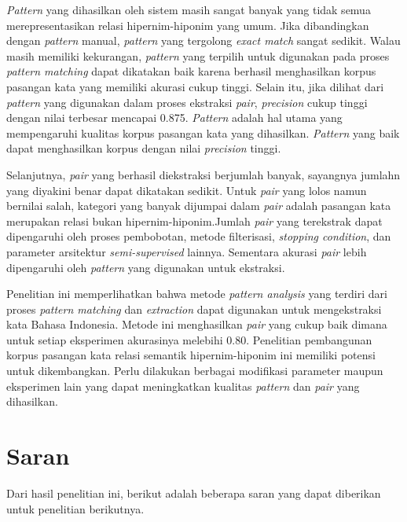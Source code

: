 \textit{Pattern} yang dihasilkan oleh sistem masih sangat banyak yang tidak semua merepresentasikan relasi hipernim-hiponim yang umum. Jika dibandingkan dengan \textit{pattern} manual, \textit{pattern} yang tergolong \textit{exact match} sangat sedikit. Walau masih memiliki kekurangan, \textit{pattern} yang terpilih untuk digunakan pada proses \textit{pattern matching} dapat dikatakan baik karena berhasil menghasilkan korpus pasangan kata yang memiliki akurasi cukup tinggi. Selain itu, jika dilihat dari \textit{pattern} yang digunakan dalam proses ekstraksi \textit{pair}, \textit{precision} cukup tinggi dengan nilai terbesar mencapai 0.875. \textit{Pattern} adalah hal utama yang mempengaruhi kualitas korpus pasangan kata yang dihasilkan. \textit{Pattern} yang baik dapat menghasilkan korpus dengan nilai \textit{precision} tinggi.

Selanjutnya, \textit{pair} yang berhasil diekstraksi berjumlah banyak, sayangnya jumlahn yang diyakini benar dapat dikatakan sedikit. Untuk \textit{pair} yang lolos namun bernilai salah, kategori yang banyak dijumpai dalam \textit{pair} adalah pasangan kata merupakan relasi bukan hipernim-hiponim.Jumlah \textit{pair} yang terekstrak dapat dipengaruhi oleh proses pembobotan, metode filterisasi, \textit{stopping condition}, dan parameter arsitektur \textit{semi-supervised} lainnya. Sementara akurasi \textit{pair} lebih dipengaruhi oleh \textit{pattern} yang digunakan untuk ekstraksi. 

Penelitian ini memperlihatkan bahwa metode \textit{pattern analysis} yang terdiri dari proses \textit{pattern matching} dan \textit{extraction} dapat digunakan untuk mengekstraksi kata Bahasa Indonesia. Metode ini menghasilkan \textit{pair} yang cukup baik dimana untuk setiap eksperimen akurasinya melebihi 0.80. Penelitian pembangunan korpus pasangan kata relasi semantik hipernim-hiponim ini memiliki potensi untuk dikembangkan. Perlu dilakukan berbagai modifikasi parameter maupun eksperimen lain yang dapat meningkatkan kualitas \textit{pattern} dan \textit{pair} yang dihasilkan.

\section{Saran}
Dari hasil penelitian ini, berikut adalah beberapa saran yang dapat diberikan untuk penelitian berikutnya.

